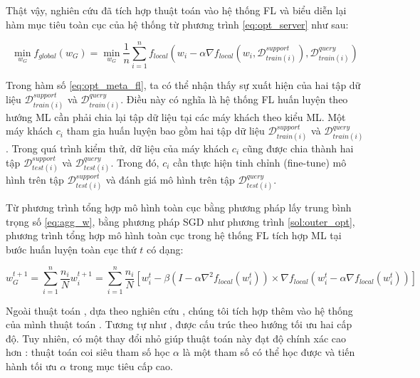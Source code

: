 Thật vậy, nghiên cứu \cite{fallah2020personalized} đã tích hợp thuật toán  vào hệ thống FL và biểu diễn lại hàm mục tiêu toàn cục của hệ thống từ phương trình \ref{eq:opt_server} như sau:

\begin{equation}
    \label{eq:opt_meta_fl}
    \min_{w_G} f_{global}(w_G)
        =\min_{w_G} \frac{1}{n} \sum_{i=1}^n f_{local}\left(w_i - \alpha \nabla f_{local}(w_i, \mathcal{D}_{train(i)}^{support}), \mathcal{D}_{train(i)}^{query}\right)
\end{equation}

Trong hàm số \ref{eq:opt_meta_fl}, ta có thể nhận thấy sự xuất hiện của hai tập dữ liệu $\mathcal{D}_{train(i)}^{support}$ và $\mathcal{D}_{train(i)}^{query}$. Điều này có nghĩa là hệ thống FL huấn luyện theo hướng ML cần phải chia lại tập dữ liệu tại các máy khách theo kiểu ML. Một máy khách $c_i$ tham gia huấn luyện bao gồm hai tập dữ liệu $\mathcal{D}_{train(i)}^{support}$ và $\mathcal{D}_{train(i)}^{query}$. Trong quá trình kiểm thử, dữ liệu của máy khách $c_i$ cũng được chia thành hai tập $\mathcal{D}_{test(i)}^{support}$ và $\mathcal{D}_{test(i)}^{query}$. Trong đó, $c_i$ cần thực hiện tinh chỉnh (fine-tune) mô hình trên tập $\mathcal{D}_{test(i)}^{support}$ và đánh giá mô hình trên tập $\mathcal{D}_{test(i)}^{query}$.

Từ phương trình tổng hợp mô hình toàn cục bằng phương pháp lấy trung bình trọng số \ref{eq:agg_w}, bằng phương pháp SGD như phương trình \ref{sol:outer_opt}, phương trình tổng hợp mô hình toàn cục trong hệ thống FL tích hợp ML tại bước huấn luyện toàn cục thứ $t$ có dạng:

\begin{dmath}
    \label{eq:agg_fedmeta}
    w_G^{t+1} = \sum_{i=1}^n{\frac{n_i}{N} w_i^{t+1}}
        = \sum_{i=1}^n{\frac{n_i}{N}\left[ w_i^t - \beta \left( I - \alpha \nabla^2 f_{local}(w_i^t) \right) \times \nabla f_{local}\left( w_i^t - \alpha\nabla f_{local}(w_i^t)\right) \right]}
\end{dmath}

Ngoài thuật toán , dựa theo nghiên cứu \cite{chen2018federated}, chúng tôi tích hợp thêm vào hệ thống của mình thuật toán  \cite{li2017meta}. Tương tự như ,  được cấu trúc theo hướng tối ưu hai cấp độ. Tuy nhiên, có một thay đổi nhỏ giúp thuật toán này đạt độ chính xác cao hơn : thuật toán coi siêu tham số học $\alpha$ là một tham số có thể học được và tiến hành tối ưu $\alpha$ trong mục tiêu cấp cao.


